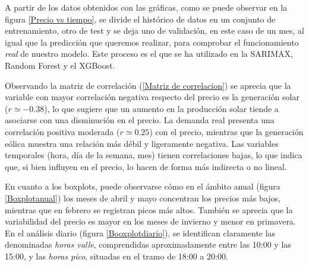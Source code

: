 A partir de los datos obtenidos con las gráficas, como se puede observar en la figura \cref{Precio vs tiempo}, se divide el histórico de datos en un conjunto de entrenamiento, otro de test y se deja uno de validación, en este caso de un mes, al igual que la predicción que queremos realizar, para comprobar el funcionamiento \textit{real} de nuestro modelo. Este proceso es el que se ha utilizado en la SARIMAX, Random Forest y el XGBoost.

Observando la matriz de correlación (\cref{Matriz de correlacion}) se aprecia que la variable con mayor correlación negativa respecto del precio es la generación solar ($r \simeq -0.38$), lo que sugiere que un aumento en la producción solar tiende a asociarse con una disminución en el precio. La demanda real presenta una correlación positiva moderada ($r \simeq 0.25$) con el precio, mientras que la generación eólica muestra una relación más débil y ligeramente negativa. Las variables temporales (hora, día de la semana, mes) tienen correlaciones bajas, lo que indica que, si bien influyen en el precio, lo hacen de forma más indirecta o no lineal.

En cuanto a los boxplots, puede observarse cómo en el ámbito anual (figura \cref{Boxplotanual}) los meses de abril y mayo concentran los precios más bajos, mientras que en febrero se registran picos más altos. También se aprecia que la variabilidad del precio es mayor en los meses de invierno y menor en primavera. En el análisis diario (figura \cref{Booxplotdiario}), se identifican claramente las denominadas \textit{horas valle}, comprendidas aproximadamente entre las 10:00 y las 15:00, y las \textit{horas pico}, situadas en el tramo de 18:00 a 20:00. 


